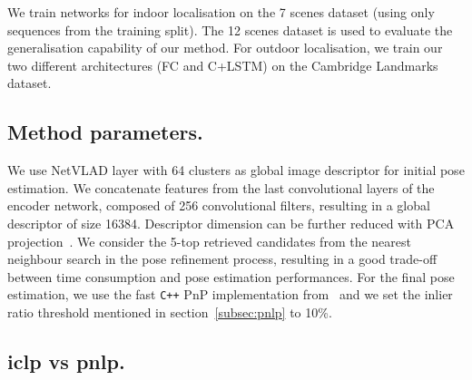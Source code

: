We train networks for indoor localisation on the 7 scenes dataset (using only sequences from the training split). The 12 scenes dataset is used to evaluate the generalisation capability of our method. For outdoor localisation, we train our two different architectures (FC and C+LSTM) on the Cambridge Landmarks dataset.

\subsection{Method parameters.} We use NetVLAD layer with 64 clusters as global image descriptor for initial pose estimation. We concatenate features from the last convolutional layers of the encoder network, composed of 256 convolutional filters, resulting in a global descriptor of size 16384. Descriptor dimension can be further reduced with PCA projection~\citep{Arandjelovic2017}. We consider the 5-top retrieved candidates from the nearest neighbour search in the pose refinement process, resulting in a good trade-off between time consumption and pose estimation performances. For the final pose estimation, we use the fast \texttt{C++} PnP implementation from~\citep{Kneip2014opengv} and we set the inlier ratio threshold mentioned in section~\ref{subsec:pnlp} to 10\%.
\subsection{\acs{iclp} vs \acs{pnlp}.} 



